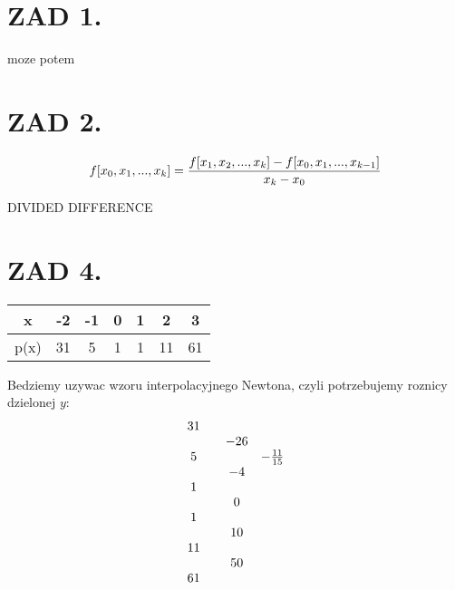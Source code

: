 \documentclass{article}[16pt]
\begin{document}
\section*{ZAD 1.}

moze potem

\section*{ZAD 2.}

\begin{align*}
    f[x_0,x_1,...,x_k]={f[x_1,x_2,...,x_k]-f[x_0,x_1,...,x_{k-1}]\over x_k-x_0}
\end{align*}

DIVIDED DIFFERENCE

\section*{ZAD 4.}

\begin{center}\begin{tabular}{ | c | c | c | c | c | c | c |}
    \hline

    x & -2 & -1 & 0 & 1 & 2 & 3\\

    \hline

    p(x) & 31 & 5 & 1 & 1 & 11 & 61\\

    \hline
\end{tabular}\end{center}

Bedziemy uzywac wzoru interpolacyjnego Newtona, czyli potrzebujemy roznicy dzielonej $y$:
\begin{align*}
    \begin{matrix}
        31\\
        & & -26\\
        5 & & & -{11\over 15}\\
        & & -4\\
        1\\
        & & 0\\
        1\\
        & & 10\\
        11\\
        & & 50\\
        61
    \end{matrix}
\end{align*}
\end{document}
